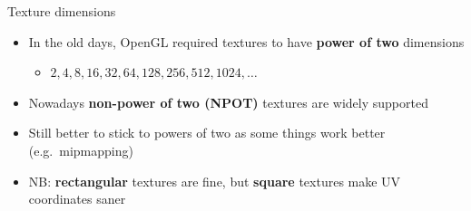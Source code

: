\begin{frame}{Texture dimensions}
	\begin{itemize}
		\item In the old days, OpenGL required textures to have \textbf{power of two} dimensions
			\begin{itemize}
				\pause\item $2, 4, 8, 16, 32, 64, 128, 256, 512, 1024, \dots$
			\end{itemize}
		\pause\item Nowadays \textbf{non-power of two (NPOT)} textures are widely supported
		\pause\item Still better to stick to powers of two as some things work better (e.g.\ mipmapping)
		\pause\item NB: \textbf{rectangular} textures are fine, but \textbf{square} textures make UV coordinates saner
	\end{itemize}
\end{frame}